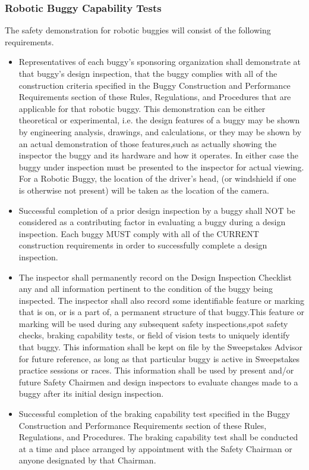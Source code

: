\subsubsection{Robotic Buggy Capability Tests}
	The safety demonstration for robotic buggies will consist of the following requirements.
\begin{itemize}
	\item
	Representatives of each buggy's sponsoring organization shall demonstrate at that buggy's design inspection, that the buggy complies with all of the construction criteria specified in the Buggy Construction and Performance Requirements section of these Rules, Regulations, and Procedures that are applicable for that robotic buggy. This demonstration can be either theoretical or experimental, i.e. the design features of a buggy may be shown by engineering analysis, drawings, and calculations, or they may be shown by an actual demonstration of those features,such as actually showing the inspector the buggy and its hardware and how it operates. In either case the buggy under inspection must be presented to the inspector for actual viewing. For a Robotic Buggy, the location of the driver’s head, (or windshield if one is otherwise not present) will be taken as the location of the camera.
	\item
	Successful completion of a prior design inspection by a buggy shall NOT be considered as a contributing factor in evaluating a buggy during a design inspection. Each buggy MUST comply with all of the CURRENT construction requirements in order to successfully complete a design inspection.
	\item
	The inspector shall permanently record on the Design Inspection Checklist any and all information pertinent to the condition of the buggy being inspected. The inspector shall also record some identifiable feature or marking that is on, or is a part of, a permanent structure of that buggy.This feature or marking will be used during any subsequent safety inspections,spot safety checks, braking capability tests, or field of vision tests to uniquely identify that buggy. This information shall be kept on file by the Sweepstakes Advisor for future reference, as long as that particular buggy is active in Sweepstakes practice sessions or races. This information shall be used by present and/or future Safety Chairmen and design inspectors to evaluate changes made to a buggy after its initial design inspection.
	\item
	Successful completion of the braking capability test specified in the Buggy Construction and Performance Requirements section of these Rules, Regulations, and Procedures. The braking capability test shall be conducted at a time and place arranged by appointment with the Safety Chairman or anyone designated by that Chairman.

\end{itemize}
